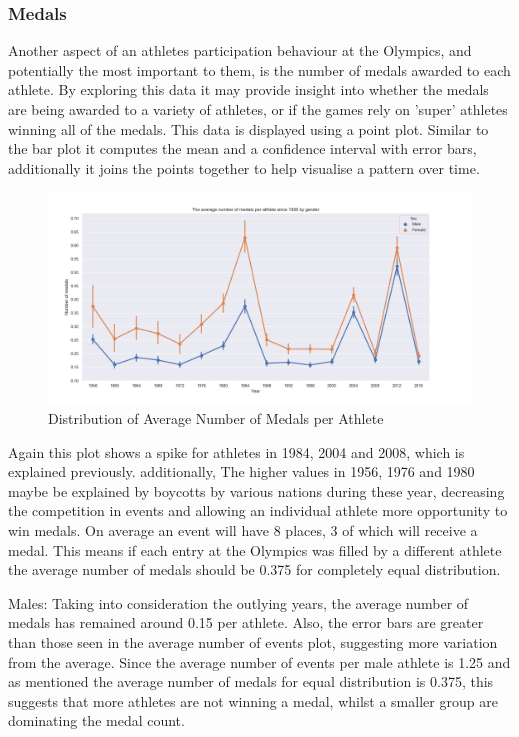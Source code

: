\documentclass[a4 paper, 12pt]{article}
\begin{document}
        \subsubsection{Medals}
        Another aspect of an athletes participation behaviour at the Olympics, and potentially the most important to them, is the number of medals awarded to each athlete. By exploring this data it may provide insight into whether the medals are being awarded to a variety of athletes, or if the games rely on 'super' athletes winning all of the medals. This data is displayed using a point plot. Similar to the bar plot it computes the mean and a confidence interval with error bars, additionally it joins the points together to help visualise a pattern over time. 

        \begin{figure} [H]
            \centering
            \includegraphics[width=\textwidth, frame]
                {./images/graph/athlete_medal_pointplot.png}      
                \caption{Distribution of Average Number of Medals per Athlete} 
        \end{figure}
        Again this plot shows a spike for athletes in 1984, 2004 and 2008, which is explained previously. additionally, The higher values in 1956, 1976 and 1980 maybe be explained by boycotts by various nations during these year, decreasing the competition in events and allowing an individual athlete more opportunity to win medals. On average an event will have 8 places, 3 of which will receive a medal. This means if each entry at the Olympics was filled by a different athlete the average number of medals should be 0.375 for completely equal distribution.          

        Males: Taking into consideration the outlying years, the average number of medals has remained around 0.15 per athlete. Also, the error bars are greater than those seen in the average number of events plot, suggesting more variation from the average. Since the average number of events per male athlete is 1.25 and as mentioned the average number of medals for equal distribution is 0.375, this suggests that more athletes are not winning a medal, whilst a smaller group are dominating the medal count.
\end{document}
